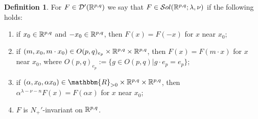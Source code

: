 \documentclass[10pt]{article} %
\newcommand{\assign}{:=}
\newcommand{\sol}{\mathcal{S}ol(\R^{p,q};\lambda,\nu)}
\theoremstyle{definition}
\newtheorem{definition}{Definition}
\begin{document}
\begin{definition}
	\label{def2}For $F \in \mathcal{D}' (\mathbb{R}^{p,q})$
	we say that $F \in \sol$ if the
  following holds:
  \begin{enumerate}
    \item if $x_0 \in \mathbb{R}^{p,q}$ and $- x_0 \in \mathbb{R}^{p,q}$, then $F (x) = F (- x)$ for $x$
    near $x_0$;
    
    \newcommand{\Stab}{O(p,q)_{e_p}}
    \item if $(m, x_0, m \cdot x_0) \in \Stab \times \R^{p,q} \times \R^{p,q}$, then $F (x)
    = F (m \cdot x)$ for $x$ near $x_0$, where $\Stab \assign \{g \in O (p, q)
    |g \cdot e_p = e_p \}$;
    
    \item if $(\alpha, x_0, \alpha x_0) \in \mathbbm{R}_{> 0} \times \R^{p,q} \times
    \R^{p,q}$, then $\alpha^{\lambda - \nu - n} F (x) = F (\alpha x)$ for $x$ near
    $x_0$;
    
    \item $F$ is $N_+'$-invariant on $\mathbb{R}^{p,q}$.{
    
    }
  \end{enumerate}
\end{definition}



\end{document}
